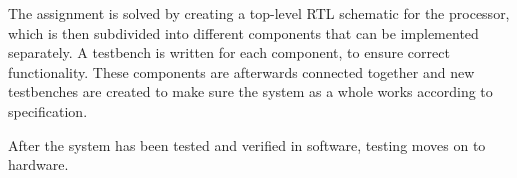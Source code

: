 The assignment is solved by creating a top-level RTL schematic for the processor, which is then subdivided into different components that can be implemented separately.
A testbench is written for each component, to ensure correct functionality.
These components are afterwards connected together and new testbenches are created to make sure the system as a whole works according to specification.

After the system has been tested and verified in software, testing moves on to hardware.
